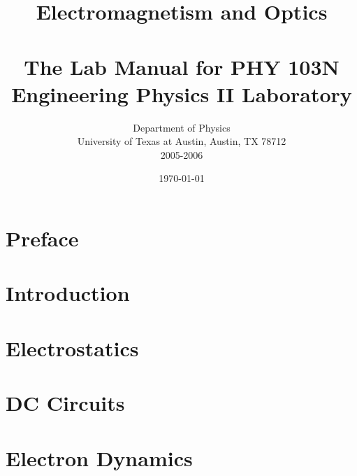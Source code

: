 \documentclass[12pt,letterpaper]{book}
\title{{\huge Electromagnetism and Optics} \\ 
\ \\
{\Large \bf The Lab Manual for PHY 103N \\
Engineering Physics II Laboratory }}
\author{ Department of Physics \\ 
 University of Texas at Austin, Austin, TX 78712\\
2005-2006}
\date{\today}
\begin{document}
\maketitle

\renewcommand{\thepage}{\roman{page}}

\tableofcontents

\renewcommand{\chaptername}{}
\renewcommand{\thechapter}{}

\chapter{Preface}  %


\renewcommand{\chaptername}{Chapter}

\renewcommand{\thepage}{\arabic{page}}
\setcounter{page}{0}

\renewcommand{\thechapter}{0}

\chapter{Introduction}
\label{ch:intro}


\renewcommand{\thechapter}{\arabic{chapter}}
\setcounter{chapter}{0}


\chapter{Electrostatics}


\chapter{DC Circuits}


\chapter{Electron Dynamics}


% 
\end{document}
